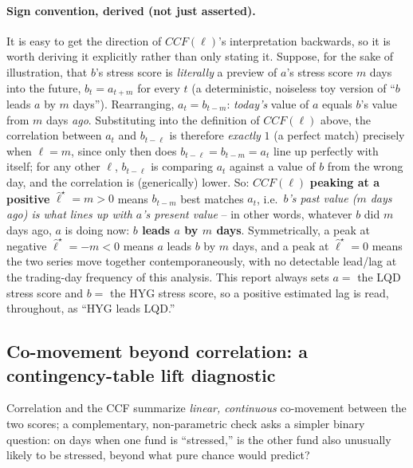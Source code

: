 \documentclass[11pt]{article}
\theoremstyle{definition}
\theoremstyle{remark}
\begin{document}
\paragraph{Sign convention, derived (not just asserted).} It is easy to get the direction of $CCF(\ell)$'s interpretation backwards, so it is worth deriving it explicitly rather than only stating it. Suppose, for the sake of illustration, that $b$'s stress score is \emph{literally} a preview of $a$'s stress score $m$ days into the future, $b_t = a_{t+m}$ for every $t$ (a deterministic, noiseless toy version of ``$b$ leads $a$ by $m$ days''). Rearranging, $a_t = b_{t-m}$: \emph{today's} value of $a$ equals $b$'s value from $m$ days \emph{ago}. Substituting into the definition of $CCF(\ell)$ above, the correlation between $a_t$ and $b_{t-\ell}$ is therefore \emph{exactly} $1$ (a perfect match) precisely when $\ell=m$, since only then does $b_{t-\ell}=b_{t-m}=a_t$ line up perfectly with itself; for any other $\ell$, $b_{t-\ell}$ is comparing $a_t$ against a value of $b$ from the wrong day, and the correlation is (generically) lower. So: $CCF(\ell)$ \textbf{peaking at a positive} $\widehat\ell^\star=m>0$ means $b_{t-m}$ best matches $a_t$, i.e.\ \emph{$b$'s past value ($m$ days ago) is what lines up with $a$'s present value} -- in other words, whatever $b$ did $m$ days ago, $a$ is doing now: \textbf{$b$ leads $a$ by $m$ days}. Symmetrically, a peak at negative $\widehat\ell^\star=-m<0$ means $a$ leads $b$ by $m$ days, and a peak at $\widehat\ell^\star=0$ means the two series move together contemporaneously, with no detectable lead/lag at the trading-day frequency of this analysis. This report always sets $a=$ the LQD stress score and $b=$ the HYG stress score, so a positive estimated lag is read, throughout, as ``HYG leads LQD.''

\subsection{Co-movement beyond correlation: a contingency-table lift diagnostic}
\label{sec:lift}

Correlation and the CCF summarize \emph{linear, continuous} co-movement between the two scores; a complementary, non-parametric check asks a simpler binary question: on days when one fund is ``stressed,'' is the other fund also unusually likely to be stressed, beyond what pure chance would predict?
\end{document}

